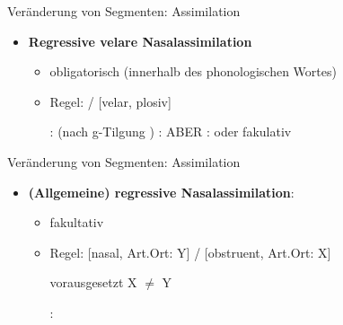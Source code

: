 
\begin{frame}{Veränderung von Segmenten: Assimilation}

\begin{itemize}
	\item \textbf{Regressive velare Nasalassimilation}

	\begin{itemize}
		\item obligatorisch (innerhalb des phonologischen Wortes)
		\item Regel:  \ras \textipa{[N]} /  \underline{\quad} [velar, plosiv]

	\eal		
		\ex {}:  \ras {} (nach g-Tilgung \ras \textipa{[fy:.{\textscr}UN]})
		\ex {}:  \ras \textipa{[baNk]}
		\ex ABER :  \ras {} oder fakulativ 
	\zl
	
 	\end{itemize}
 \end{itemize}
 \end{frame}


\begin{frame}{Veränderung von Segmenten: Assimilation}
 
\begin{itemize}

	\item \textbf{(Allgemeine) regressive Nasalassimilation}:

	\begin{itemize}
		\item fakultativ
		\item Regel: [nasal, Art.Ort: Y]  /  \underline{\quad} [obstruent, Art.Ort: X]
		
		vorausgesetzt X $\neq$ Y

		\ea {}:  \ras \textipa{[fYmf]}
		\z
		
	\end{itemize}		

\end{itemize}

\end{frame}


